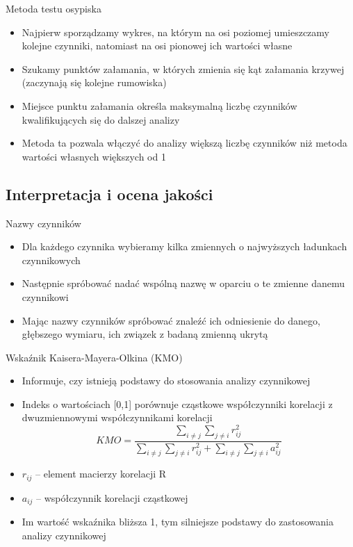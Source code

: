 \documentclass{beamer}
\begin{document}
\begin{frame}{Metoda testu osypiska}
  \begin{itemize}
  \item Najpierw sporządzamy wykres, na którym na osi poziomej umieszczamy kolejne czynniki, natomiast na osi pionowej ich wartości własne
  \item Szukamy punktów załamania, w których zmienia się kąt załamania krzywej (zaczynają się kolejne rumowiska)
  \item Miejsce punktu załamania określa maksymalną liczbę czynników kwalifikujących się do dalszej analizy
   \item Metoda ta pozwala włączyć do analizy większą liczbę czynników niż metoda wartości własnych większych od 1
   \end{itemize}
\end{frame}

\subsection{Interpretacja i ocena jakości}

\begin{frame}{Nazwy czynników}
  \begin{itemize}
  \item Dla każdego czynnika wybieramy kilka zmiennych o najwyższych ładunkach czynnikowych
  \item Następnie spróbować nadać wspólną nazwę w oparciu o te zmienne danemu czynnikowi
  \item Mając nazwy czynników spróbować znaleźć ich odniesienie do danego, głębszego wymiaru, ich związek z badaną zmienną ukrytą
   \end{itemize}
\end{frame}

\begin{frame}{Wskaźnik Kaisera-Mayera-Olkina (KMO)}
  \begin{itemize}
  \item Informuje, czy istnieją podstawy do stosowania analizy czynnikowej
  \item Indeks o wartościach [0,1] porównuje cząstkowe współczynniki korelacji z dwuzmiennowymi współczynnikami korelacji
    $$KMO = \frac{\sum_{i \ne j}\sum_{j \ne i} r_{ij}^2}{\sum_{i \ne j}\sum_{j \ne i}r^2_{ij} + \sum_{i \ne j}\sum_{j \ne i}a^2_{ij} }$$
  \item $r_{ij}$ -- element macierzy korelacji R
  \item $a_{ij}$ -- współczynnik korelacji cząstkowej
  \item Im wartość wskaźnika bliższa 1, tym silniejsze podstawy do zastosowania analizy czynnikowej
   \end{itemize}
\end{frame}
\end{document}
